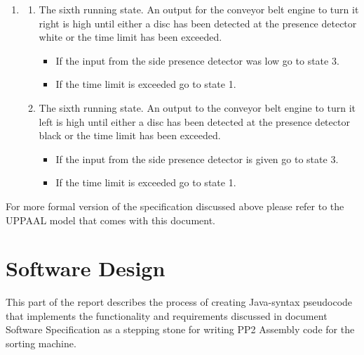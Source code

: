 \documentclass[a4paper,oneside,11pt]{report}
\begin{document}
\begin{enumerate}
\item
    \begin{enumerate}
        \item The sixth running state. An output for the conveyor belt engine to turn it right is high until either a disc has been detected at the presence detector white or the time limit has been exceeded.
                \begin{itemize}
                    \item If the input from the side presence detector was low go to state 3.
                    \item If the time limit is exceeded go to state 1.
                \end{itemize}
        \item The sixth running state. An output to the conveyor belt engine to turn it left is high until either a disc has been detected at the presence detector black or the time limit has been exceeded.
                \begin{itemize}
                    \item If the input from the side presence detector is given go to state 3.
                    \item If the time limit is exceeded go to state 1.
                \end{itemize}
    \end{enumerate}
\end{enumerate}

For more formal version of the specification discussed above please refer to the UPPAAL model that comes with this document.

\chapter{Software Design}
This part of the report describes the process of creating Java-syntax pseudocode that implements the functionality and requirements discussed in document Software Specification as a stepping stone for writing PP2 Assembly code for the sorting machine.
\end{document}
